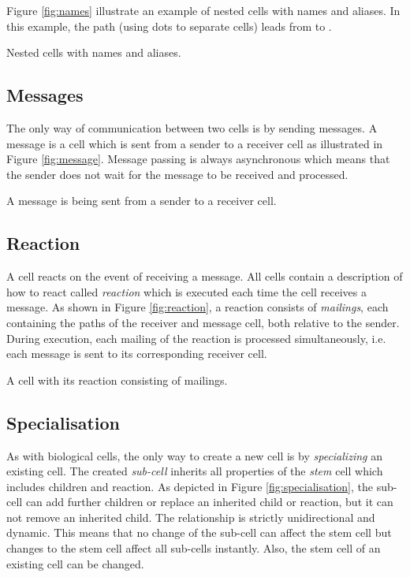 Figure \ref{fig:names} illustrate an example of nested cells with names and aliases. In this example, the path  (using dots to separate cells) leads from  to . 

{Nested cells with names and aliases.}

\subsection{Messages}

The only way of communication between two cells is by sending messages. A message is a cell which is sent from a sender to a receiver cell as illustrated in Figure \ref{fig:message}. Message passing is always asynchronous which means that the sender does not wait for the message to be received and processed.

{A message is being sent from a sender to a receiver cell.}

\subsection{Reaction}
\label{sec:reaction}

A cell reacts on the event of receiving a message. All cells contain a description of how to react called \textit{reaction} which is executed each time the cell receives a message. As shown in Figure \ref{fig:reaction}, a reaction consists of \textit{mailings}, each containing the paths of the receiver and message cell, both relative to the sender. During execution, each mailing of the reaction is processed simultaneously, i.e. each message is sent to its corresponding receiver cell.

{A cell with its reaction consisting of mailings.}

\subsection{Specialisation}

As with biological cells, the only way to create a new cell is by \textit{specializing} an existing cell. The created \textit{sub-cell} inherits all properties of the \textit{stem} cell which includes children and reaction. As depicted in Figure \ref{fig:specialisation}, the sub-cell can add further children or replace an inherited child or reaction, but it can not remove an inherited child. The relationship is strictly unidirectional and dynamic. This means that no change of the sub-cell can affect the stem cell but changes to the stem cell affect all sub-cells instantly. Also, the stem cell of an existing cell can be changed.

